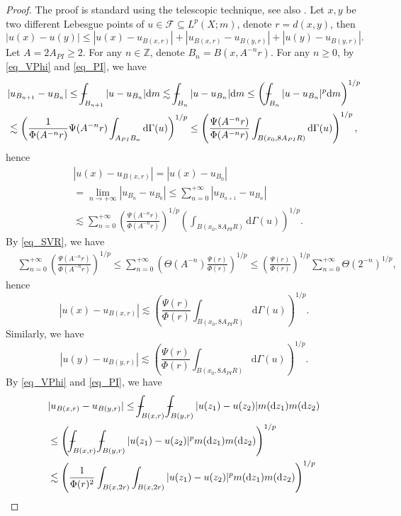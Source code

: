 \documentclass[11pt,a4paper]{article}
\numberwithin{equation}{section}
\def\Xint#1{\mathchoice
{\XXint\displaystyle\textstyle{#1}}%
{\XXint\textstyle\scriptstyle{#1}}%
{\XXint\scriptstyle\scriptscriptstyle{#1}}%
{\XXint\scriptscriptstyle\scriptscriptstyle{#1}}%
\!\int}
\def\XXint#1#2#3{{\setbox0=\hbox{$#1{#2#3}{\int}$ }
\vcenter{\hbox{$#2#3$ }}\kern-.6\wd0}}
\def\dashint{\Xint-}
\theoremstyle{plain}
\theoremstyle{definition}
\begin{document}
\begin{proof}
The proof is standard using the telescopic technique, see also \cite[Page 1654]{BCK05}. Let $x,y$ be two different Lebesgue points of $u\in\mathcal{F}\subseteq L^p(X;m)$, denote $r=d(x,y)$, then
$$|u(x)-u(y)|\le|u(x)-u_{B(x,r)}|+|u_{B(x,r)}-u_{B(y,r)}|+|u(y)-u_{B(y,r)}|.$$
Let $A=2A_{PI}\ge2$. For any $n\in\mathbb{Z}$, denote $B_n=B(x,A^{-n}r)$. For any $n\ge0$, by \ref{eq_VPhi} and \ref{eq_PI}, we have
\begin{align*}
&|u_{B_{n+1}}-u_{B_n}|\le\dashint_{B_{n+1}}|u-u_{B_n}|\mathrm{d} m\lesssim\dashint_{B_n}|u-u_{B_n}|\mathrm{d} m\le\left(\dashint_{B_n}|u-u_{B_n}|^p\mathrm{d} m\right)^{1/p}\\
&\lesssim\left(\frac{1}{\Phi(A^{-n}r)}\Psi(A^{-n}r)\int_{A_{PI}B_{n}}\mathrm{d}\Gamma(u)\right)^{1/p}\le\left(\frac{\Psi(A^{-n}r)}{\Phi(A^{-n}r)}\int_{B(x_0,8A_{PI}R)}\mathrm{d}\Gamma(u)\right)^{1/p},
\end{align*}
hence
\begin{align*}
&|u(x)-u_{B(x,r)}|=|u(x)-u_{B_0}|\\
&=\lim_{n\to+\infty}|u_{B_{n}}-u_{B_0}|\le\sum_{n=0}^{+\infty}|u_{B_{n+1}}-u_{B_n}|\\
&\lesssim\sum_{n=0}^{+\infty}\left(\frac{\Psi(A^{-n}r)}{\Phi(A^{-n}r)}\right)^{1/p}\left(\int_{B(x_0,8A_{PI}R)}\mathrm{d}\Gamma(u)\right)^{1/p}.
\end{align*}
By \ref{eq_SVR}, we have
\begin{align*}
&\sum_{n=0}^{+\infty}\left(\frac{\Psi(A^{-n}r)}{\Phi(A^{-n}r)}\right)^{1/p}\le\sum_{n=0}^{+\infty}\left(\Theta(A^{-n})\frac{\Psi(r)}{\Phi(r)}\right)^{1/p}\le\left(\frac{\Psi(r)}{\Phi(r)}\right)^{1/p}\sum_{n=0}^{+\infty}\Theta\left(2^{-n}\right)^{1/p},
\end{align*}
hence
$$|u(x)-u_{B(x,r)}|\lesssim\left(\frac{\Psi(r)}{\Phi(r)}\int_{B(x_0,8A_{PI}R)}\mathrm{d}\Gamma(u)\right)^{1/p}.$$
Similarly, we have
$$|u(y)-u_{B(y,r)}|\lesssim\left(\frac{\Psi(r)}{\Phi(r)}\int_{B(x_0,8A_{PI}R)}\mathrm{d}\Gamma(u)\right)^{1/p}.$$
By \ref{eq_VPhi} and \ref{eq_PI}, we have
\begin{align*}
&|u_{B(x,r)}-u_{B(y,r)}|\le\dashint_{B(x,r)}\dashint_{B(y,r)}|u(z_1)-u(z_2)|m(\mathrm{d} z_1)m(\mathrm{d} z_2)\\
&\le\left(\dashint_{B(x,r)}\dashint_{B(y,r)}|u(z_1)-u(z_2)|^pm(\mathrm{d} z_1)m(\mathrm{d} z_2)\right)^{1/p}\\
&\lesssim\left(\frac{1}{\Phi(r)^2}\int_{B(x,2r)}\int_{B(x,2r)}|u(z_1)-u(z_2)|^pm(\mathrm{d} z_1)m(\mathrm{d} z_2)\right)^{1/p}\\

\end{align*}
\end{proof}
\end{document}
